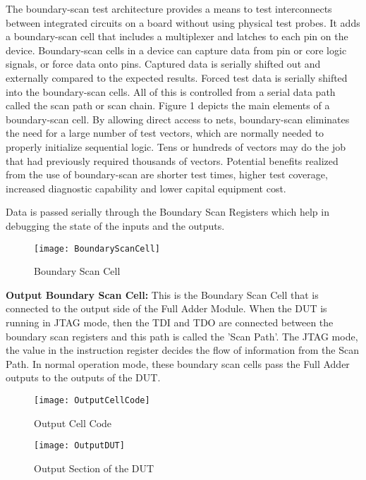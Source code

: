 \documentclass[a4paper,11pt]{article}
\begin{document}
The boundary-scan test architecture provides a means to test interconnects between integrated circuits on a board without using physical test probes. It adds a boundary-scan cell that includes a multiplexer and latches to each pin on the device. Boundary-scan cells in a device can capture data from pin or core logic signals, or force data onto pins. Captured data is serially shifted out and externally compared to the expected results. Forced test data is serially shifted into the boundary-scan cells. All of this is controlled from a serial data path called the scan path or scan chain. Figure 1 depicts the main elements of a boundary-scan cell. By allowing direct access to nets, boundary-scan eliminates the need for a large number of test vectors, which are normally needed to properly initialize sequential logic. Tens or hundreds of vectors may do the job that had previously required thousands of vectors. Potential benefits realized from the use of boundary-scan are shorter test times, higher test coverage, increased diagnostic capability and lower capital equipment cost.

Data is passed serially through the Boundary Scan Registers which help in debugging the state of the inputs and the outputs.

\begin{figure}[ht]
\centering
\texttt{[image: BoundaryScanCell]}
\caption{Boundary Scan Cell \cite{corelis}}
\label{fig:Boundary Scan Cell}
\end{figure}

\textbf{Output Boundary Scan Cell:}
This is the Boundary Scan Cell that is connected to the output side of the Full Adder Module. When the DUT is running in JTAG mode, then the TDI and TDO are connected between the boundary scan registers and this path is called the 'Scan Path'. The JTAG mode, the value in the instruction register decides the flow of information from the Scan Path. In normal operation mode, these boundary scan cells pass the Full Adder outputs to the outputs of the DUT.

\begin{figure}[ht]
\centering
\texttt{[image: OutputCellCode]}
\caption{Output Cell Code}
\label{fig: Output Cell Code}
\end{figure}

\begin{figure}[ht]
\centering
\texttt{[image: OutputDUT]}
\caption{Output Section of the DUT}
\label{fig: Output DUT}
\end{figure}
\end{document}
